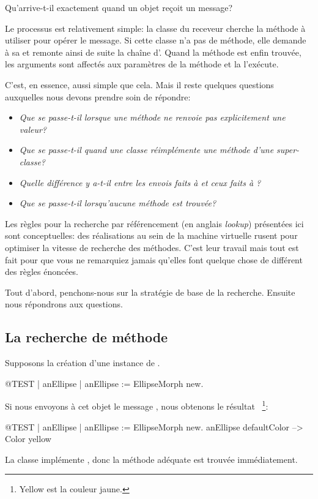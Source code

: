 \documentclass[a4paper,10pt,twoside]{book}
\begin{document}

Qu'arrive-t-il exactement quand un objet reçoit un message?

Le processus est relativement simple:
la classe du receveur cherche la méthode à utiliser pour opérer le message.
Si cette classe n'a pas de méthode, elle demande à sa  et remonte ainsi de suite la chaîne d'.
Quand la méthode est enfin trouvée, les arguments sont affectés aux paramètres de la méthode et la  l'exécute.

C'est, en essence, aussi simple que cela.
Mais il reste quelques questions auxquelles nous devons prendre soin de répondre:

\begin{itemize}
  \item \emph{Que se passe-t-il lorsque une méthode ne renvoie pas explicitement une valeur?}
  \item \emph{Que se passe-t-il quand une classe réimplémente une méthode d'une super-classe?}
  \item \emph{Quelle différence y a-t-il entre les envois faits à  et ceux faits à ?}
  \item \emph{Que se passe-t-il lorsqu'aucune méthode est trouvée?}
\end{itemize}

Les règles pour la recherche par référencement (en anglais \emph{lookup}) présentées ici sont conceptuelles: des réalisations au sein de la machine virtuelle rusent pour optimiser la vitesse de recherche des méthodes. 
C'est leur travail mais tout est fait pour que vous ne remarquiez jamais qu'elles font quelque chose de différent des règles énoncées.

Tout d'abord, penchons-nous sur la stratégie de base de la recherche. Ensuite nous répondrons aux questions.

\subsection{La recherche de méthode}
Supposons la création d'une instance de .
\begin{code}{@TEST | anEllipse |}
anEllipse := EllipseMorph new.
\end{code}
\noindent
Si nous envoyons à cet objet le message , nous obtenons le résultat ~\footnote{Yellow est la couleur jaune.}:
\begin{code}{@TEST | anEllipse | anEllipse := EllipseMorph new.}
anEllipse defaultColor --> Color yellow
\end{code}
\noindent
La classe  implémente , donc la méthode adéquate est trouvée immédiatement.
\end{document}
